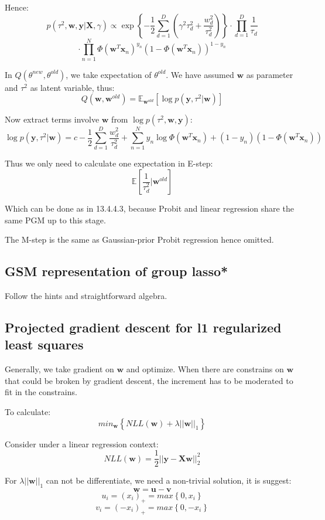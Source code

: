 \documentclass[UTF8]{ctexart}
\begin{document}
Hence:
$$p(\tau^{2},\textbf{w},\textbf{y}|\textbf{X},\gamma)\propto \exp\left\{ -\frac{1}{2}\sum_{d=1}^{D}(\gamma^{2}\tau_{d}^{2} + \frac{w_{d}^{2}}{\tau_{d}^{2}}) \right\}\cdot \prod_{d=1}^{D}\frac{1}{\tau_{d}}$$
$$\cdot \prod_{n=1}^{N}\Phi(\textbf{w}^{T}\textbf{x}_{n})^{y_{n}}(1-\Phi(\textbf{w}^{T}\textbf{x}_{n}))^{1-y_{n}}$$

In $Q(\theta^{new},\theta^{old})$, we take expectation of $\theta^{old}$. We have assumed $\textbf{w}$ as parameter and $\tau^{2}$ as latent variable, thus:
$$Q(\textbf{w},\textbf{w}^{old})=\mathbb{E}_{\textbf{w}^{old}}[\log p(\textbf{y},\tau^{2}|\textbf{w})]$$

Now extract terms involve $\textbf{w}$ from $\log p(\tau^{2},\textbf{w},\textbf{y})$:
$$\log p(\textbf{y},\tau^{2}|\textbf{w}) = c -\frac{1}{2}\sum_{d=1}^{D} \frac{w_{d}^{2}}{\tau_{d}^{2}} + \sum_{n=1}^{N} y_{n}\log \Phi(\textbf{w}^{T}\textbf{x}_{n}) + (1-y_{n})(1-\Phi(\textbf{w}^{T}\textbf{x}_{n}))$$

Thus we only need to calculate one expectation in E-step:
$$\mathbb{E}[\frac{1}{\tau_{d}^{2}}|\textbf{w}^{old}]$$

Which can be done as in 13.4.4.3, because Probit and linear regression share the same PGM up to this stage.

The M-step is the same as Gaussian-prior Probit regression hence omitted.

\subsection{GSM representation  of group lasso*}
Follow the hints and straightforward algebra.

\subsection{Projected gradient descent for l1 regularized least squares}
Generally, we take gradient on $\textbf{w}$ and optimize. When there are constrains on $\textbf{w}$ that could be broken by gradient descent, the increment has to be moderated to fit in the constrains.

To calculate:
$$min_{\textbf{w}}\left\{ NLL(\textbf{w}) +\lambda||\textbf{w}||_{1}\right\}$$

Consider under a linear regression context:
$$NLL(\textbf{w})=\frac{1}{2}||\textbf{y}-\textbf{X}\textbf{w}||^{2}_{2}$$

For $\lambda||\textbf{w}||_{1}$ can not be differentiate, we need a non-trivial solution, it is suggest:
$$\textbf{w}=\textbf{u}-\textbf{v}$$
$$u_{i}=(x_{i})_{+}=max \left\{ 0,x_{i} \right\}$$
$$v_{i}=(-x_{i})_{+}=max \left\{ 0,-x_{i} \right\}$$
\end{document}
